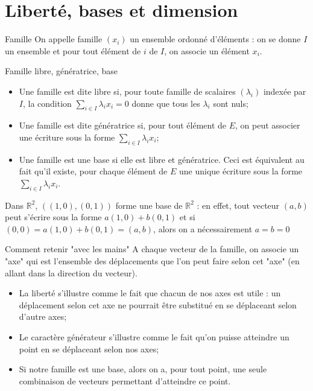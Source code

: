 \documentclass{classe}
\begin{document}
\section{Liberté, bases et dimension}

\begin{définition}{Famille}{}
On appelle famille $(x_i)$ un ensemble ordonné d'éléments : on se donne $I$ un ensemble et pour tout élément de $i$ de $I$, on associe un élément $x_i$.
\end{définition}

\begin{définition}{Famille libre, génératrice, base}{}
\begin{itemize}
\item Une famille est dite libre si, pour toute famille de scalaires $(\lambda_i)$ indexée par $I$, la condition $\sum_{i\in I} \lambda_i x_i = 0$ donne que tous les $\lambda_i$ sont nuls;
\item Une famille est dite génératrice si, pour tout élément de $E$, on peut associer une écriture sous la forme $\sum_{i\in I} \lambda_i x_i$;
\item Une famille est une base si elle est libre et génératrice. Ceci est équivalent au fait qu'il existe, pour chaque élément de $E$ une unique écriture sous la forme $\sum_{i\in I} \lambda_i x_i$.
\end{itemize}
\end{définition}

\begin{example}
Dans $\mathbb{R}^2$, $((1, 0),(0, 1))$ forme une base de $\mathbb{R}^2$ : en effet, tout vecteur $(a, b)$ peut s'écrire sous la forme $a(1, 0) + b(0, 1)$ et si $(0, 0) = a(1, 0) + b(0, 1) = (a, b)$, alors on a nécessairement $a=b=0$
\end{example}

\begin{remarque}{Comment retenir "avec les mains"}{}
A chaque vecteur de la famille, on associe un "axe" qui est l'ensemble des déplacements que l'on peut faire selon cet "axe" (en allant dans la direction du vecteur).
\begin{itemize}
	\item La liberté s'illustre comme le fait que chacun de nos axes est utile : un déplacement selon cet axe ne pourrait être substitué en se déplaceant selon d'autre axes;
	\item Le caractère générateur s'illustre comme le fait qu'on puisse atteindre un point en se déplaceant selon nos axes;
	\item Si notre famille est une base, alors on a, pour tout point, une seule combinaison de vecteurs permettant d'atteindre ce point.
\end{itemize}
\end{remarque}
\end{document}
